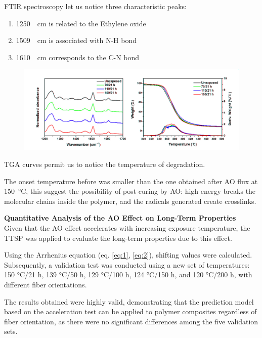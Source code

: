 \documentclass[10pt]{beamer}
\begin{document}
\begin{frame}
FTIR spectroscopy let us notice three characteristic peaks:
\begin{enumerate}
\item  \SI{1250}{\per\centi\meter}  is related to the Ethylene oxide 
\item \SI{1509}{\per\centi\meter} is associated with N-H bond
\item \SI{1610}{\per\centi\meter} corresponds to the C-N bond
\end{enumerate}
\begin{figure}[H]
\centering
\includegraphics[width=0.7\linewidth]{figures/screenshot008}
\label{fig:screenshot008}
\end{figure}
TGA curves permit us to notice the temperature of degradation. 

The onset temperature before was smaller than the one obtained after AO flux at \SI{150}{\degreeCelsius}, this suggest the possibility of post-curing by AO: high energy breaks
the molecular chains inside the polymer, and the radicals generated create crosslinks. 
\end{frame}

\begin{frame}
\textbf{Quantitative Analysis of the AO Effect on Long-Term Properties}\\

Given that the AO effect accelerates with increasing exposure temperature, the TTSP was applied to evaluate the long-term properties due to this effect. \newline

Using the Arrhenius equation (eq. \ref{eq:1}, \ref{eq:2}), shifting values were calculated. Subsequently, a validation test was conducted using a new set of temperatures: 150 °C/21 h, 139 °C/50 h, 129 °C/100 h, 124 °C/150 h, and 120 °C/200 h, with different fiber orientations. \newline 

The results obtained were highly valid, demonstrating that the prediction model based on the acceleration test can be applied to polymer composites regardless of fiber orientation, as there were no significant differences among the five validation sets.

\end{frame}
\end{document}
